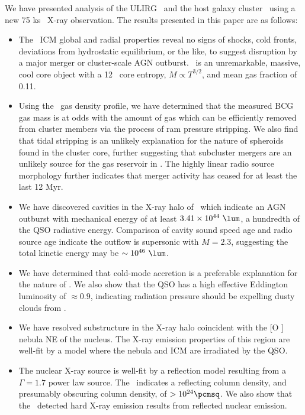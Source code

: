 \documentclass[useAMS,usenatbib]{mn2e}
\begin{document}
We have presented analysis of the ULIRG \iras\ and the host galaxy
cluster \rxj\ using a new 75 ks \chandra\ X-ray observation. The
results presented in this paper are as follows:
\begin{itemize}
\item The \rxj\ ICM global and radial properties reveal no signs of
  shocks, cold fronts, deviations from hydrostatic equilibrium, or the
  like, to suggest disruption by a major merger or cluster-scale AGN
  outburst. \rxj\ is an unremarkable, massive, cool core object with a
  12 \ent\ core entropy, $M \propto T^{3/2}$, and mean gas fraction of
  0.11.
\item Using the \rxj\ gas density profile, we have determined that the
  measured BCG gas mass is at odds with the amount of gas which can be
  efficiently removed from cluster members via the process of ram
  pressure stripping. We also find that tidal stripping is an unlikely
  explanation for the nature of spheroids found in the cluster core,
  further suggesting that subcluster mergers are an unlikely source
  for the gas reservoir in \irs. The highly linear radio source
  morphology further indicates that merger activity has ceased for at
  least the last 12 Myr.
\item We have discovered cavities in the X-ray halo of \irs\ which
  indicate an AGN outburst with mechanical energy of at least $3.41
  \times 10^{44} ~\lum$, a hundredth of the QSO radiative
  energy. Comparison of cavity sound speed age and radio source age
  indicate the outflow is supersonic with $M = 2.3$, suggesting the
  total kinetic energy may be $\sim 10^{46} ~\lum$.
\item We have determined that cold-mode accretion is a preferable
  explanation for the nature of \irs. We also show that the QSO has a
  high effective Eddington luminosity of $\approx 0.9$, indicating
  radiation pressure should be expelling dusty clouds from \irs.
\item We have resolved substructure in the X-ray halo coincident with
  the [O ] nebula NE of the nucleus. The X-ray emission
  properties of this region are well-fit by a model where the nebula
  and ICM are irradiated by the QSO.
\item The nuclear X-ray source is well-fit by a reflection model
  resulting from a $\Gamma=1.7$ power law source. The
  \fekaew\ indicates a reflecting column density, and presumably
  obscuring column density, of $> 10^{24} \pcmsq$. We also show that
  the \bepposax\ detected hard X-ray emission results from reflected
  nuclear emission.
\end{itemize}
\end{document}

